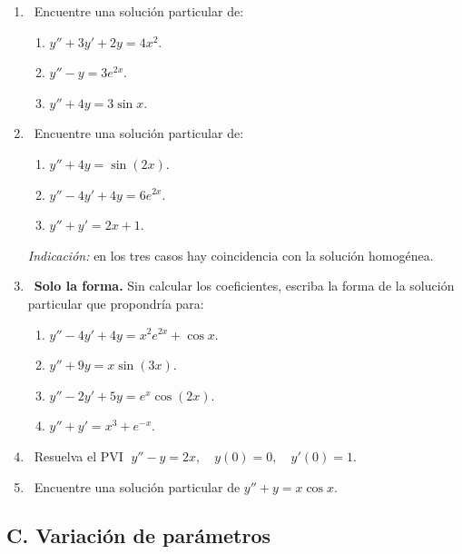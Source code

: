 \begin{enumerate}[label=\textbf{B\arabic*.}, leftmargin=*]
    \item \facil\ Encuentre una soluci\'on particular de:
    \begin{enumerate}[label=\alph*)]
        \item $y''+3y'+2y=4x^2$.
        \item $y''-y=3e^{2x}$.
        \item $y''+4y=3\sin x$.
    \end{enumerate}
    \item \medio\ Encuentre una soluci\'on particular de:
    \begin{enumerate}[label=\alph*)]
        \item $y''+4y=\sin(2x)$.
        \item $y''-4y'+4y=6e^{2x}$.
        \item $y''+y'=2x+1$.
    \end{enumerate}
    \textit{Indicaci\'on:} en los tres casos hay coincidencia con la soluci\'on homog\'enea.
    \item \medio\ \textbf{Solo la forma.} Sin calcular los coeficientes, escriba la forma de la soluci\'on particular que propondr\'ia para:
    \begin{enumerate}[label=\alph*)]
        \item $y''-4y'+4y=x^2e^{2x}+\cos x$.
        \item $y''+9y=x\sin(3x)$.
        \item $y''-2y'+5y=e^{x}\cos(2x)$.
        \item $y''+y'=x^3+e^{-x}$.
    \end{enumerate}
    \item \medio\ Resuelva el PVI $\;y''-y=2x,\quad y(0)=0,\quad y'(0)=1$.
    \item \dificil\ Encuentre una soluci\'on particular de $y''+y=x\cos x$.
\end{enumerate}

\subsection*{C. Variaci\'on de par\'ametros}


